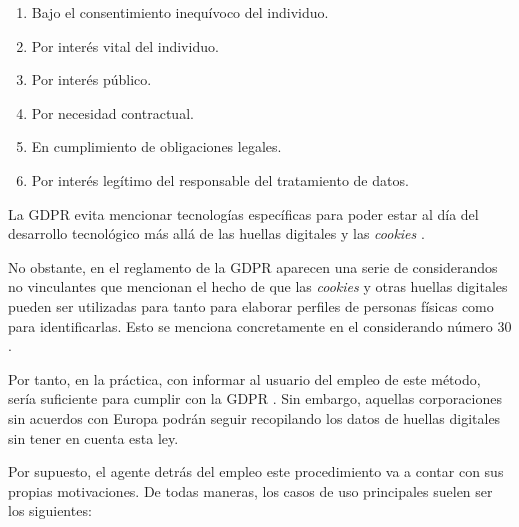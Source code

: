 \begin{enumerate}
\item Bajo el consentimiento inequívoco del individuo.
\item Por interés vital del individuo.
\item Por interés público.
\item Por necesidad contractual.
\item En cumplimiento de obligaciones legales.
\item Por interés legítimo del responsable del tratamiento de datos.
\end{enumerate}

La GDPR evita mencionar tecnologías específicas para poder estar al día del desarrollo tecnológico más allá de las huellas digitales y las \textit{cookies} \cite{gdpr_eff}. \par 

No obstante, en el reglamento de la GDPR aparecen una serie de considerandos no vinculantes que mencionan el hecho de que las \textit{cookies} y otras huellas digitales pueden ser utilizadas para tanto para elaborar perfiles de personas físicas como para identificarlas. Esto se menciona concretamente en el considerando número 30 \cite{gdpr}. \par 

Por tanto, en la práctica, con informar al usuario del empleo de este método, sería suficiente para cumplir con la GDPR \cite{blokt}. Sin embargo, aquellas corporaciones sin acuerdos con Europa podrán seguir recopilando los datos de huellas digitales sin tener en cuenta esta ley. \par

Por supuesto, el agente detrás del empleo este procedimiento va a contar con sus propias motivaciones. De todas maneras, los casos de uso principales suelen ser los siguientes: \par

